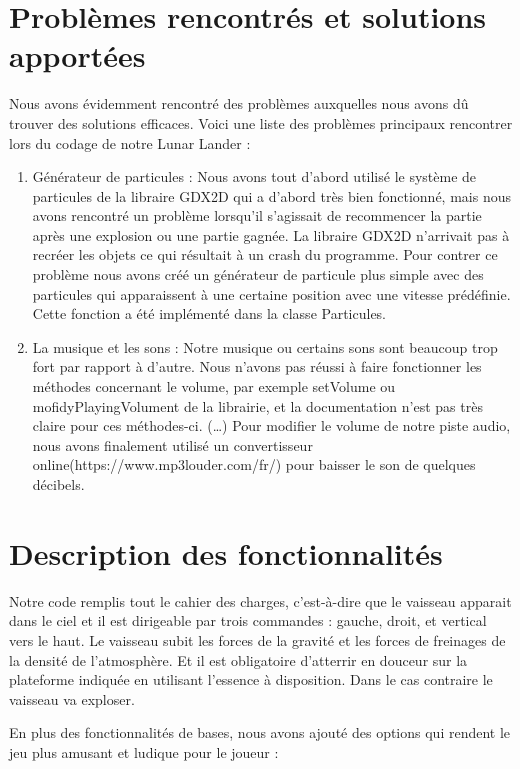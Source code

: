\section{Problèmes rencontrés et solutions apportées}
Nous avons évidemment rencontré des problèmes auxquelles nous avons dû trouver des solutions efficaces. Voici une liste des problèmes principaux rencontrer lors du codage de notre Lunar Lander :
\begin{enumerate}
 \item Générateur de particules : Nous avons tout d’abord utilisé le système de particules de la libraire GDX2D qui a d’abord très bien fonctionné, mais nous avons rencontré un problème lorsqu’il s’agissait de recommencer la partie après une explosion ou une partie gagnée. La libraire GDX2D n’arrivait pas à recréer les objets ce qui résultait à un crash du programme. Pour contrer ce problème nous avons créé un générateur de particule plus simple avec des particules qui apparaissent à une certaine position avec une vitesse prédéfinie. Cette fonction a été implémenté dans la classe Particules.
 \item	La musique et les sons : Notre musique ou certains sons sont beaucoup trop fort par rapport à d’autre. Nous n’avons pas réussi à faire fonctionner les méthodes concernant le volume, par exemple setVolume ou mofidyPlayingVolument de la librairie, et la documentation n’est pas très claire pour ces méthodes-ci. (…) Pour modifier le volume de notre piste audio, nous avons finalement utilisé un convertisseur online(https://www.mp3louder.com/fr/) pour baisser le son de quelques décibels.
\end{enumerate}

\section{Description des fonctionnalités}
Notre code remplis tout le cahier des charges, c’est-à-dire que le vaisseau apparait dans le ciel et il est dirigeable par trois commandes : gauche, droit, et vertical vers le haut. Le vaisseau subit les forces de la gravité et les forces de freinages de la densité de l’atmosphère. Et il est obligatoire d’atterrir en douceur sur la plateforme indiquée en utilisant l’essence à disposition. Dans le cas contraire le vaisseau va exploser.

En plus des fonctionnalités de bases, nous avons ajouté des options qui rendent le jeu plus amusant et ludique pour le joueur :

